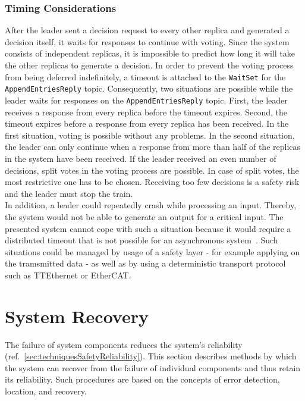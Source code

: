 \subsubsection{Timing Considerations}

After the leader sent a decision request to every other replica and generated a decision itself, it waits for responses to continue with voting.
Since the system consists of independent replicas, it is impossible to predict how long it will take the other replicas to generate a decision.
In order to prevent the voting process from being deferred indefinitely, a timeout is attached to the \texttt{WaitSet} for the \texttt{AppendEntriesReply} topic.
Consequently, two situations are possible while the leader waits for responses on the \texttt{AppendEntriesReply} topic.
First, the leader receives a response from every replica before the timeout expires.
Second, the timeout expires before a response from every replica has been received.
In the first situation, voting is possible without any problems.
In the second situation, the leader can only continue when a response from more than half of the replicas in the system have been received.
If the leader received an even number of decisions, split votes in the voting process are possible.
In case of split votes, the most restrictive one has to be chosen.
Receiving too few decisions is a safety risk and the leader must stop the train.
\\

In addition, a leader could repeatedly crash while processing an input.
Thereby, the system would not be able to generate an output for a critical input.
The presented system cannot cope with such a situation because it would require a distributed timeout that is not possible for an asynchronous system~\cite{FLPProblemConsensus}.
Such situations could be managed by usage of a safety layer - for example applying  on the tramsmitted data -  as well as by using a deterministic transport protocol~\cite{DeterministicTransport} such as TTEthernet or EtherCAT.

\section{System Recovery}

The failure of system components reduces the system's reliability (ref.~\autoref{sec:techniquesSafetyReliability}).
This section describes methods by which the system can recover from the failure of individual components and thus retain its reliability.
Such procedures are based on the concepts of error detection, location, and recovery.
\\

